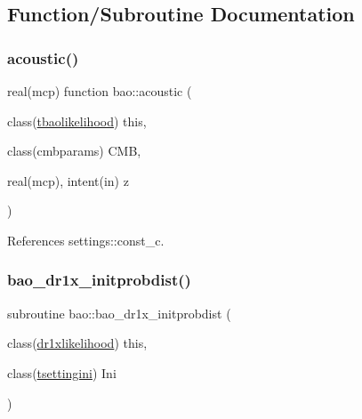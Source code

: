 \subsection{Function/\+Subroutine Documentation}
\mbox{\label{namespacebao_a42575daf8f5c1b68a1a7ddf8bd087988}} 
\subsubsection{\texorpdfstring{acoustic()}{acoustic()}}
{\footnotesize\ttfamily real(mcp) function bao\+::acoustic (\begin{DoxyParamCaption}\item[{class(\mbox{\hyperlink{structbao_1_1tbaolikelihood}{tbaolikelihood}})}]{this,  }\item[{class(cmbparams)}]{C\+MB,  }\item[{real(mcp), intent(in)}]{z }\end{DoxyParamCaption})\hspace{0.3cm}{\ttfamily [private]}}



References settings\+::const\+\_\+c.

\mbox{\label{namespacebao_a01a1351c073ed9d3a96aece01f8c368b}} 
\subsubsection{\texorpdfstring{bao\+\_\+dr1x\+\_\+initprobdist()}{bao\_dr1x\_initprobdist()}}
{\footnotesize\ttfamily subroutine bao\+::bao\+\_\+dr1x\+\_\+initprobdist (\begin{DoxyParamCaption}\item[{class(\mbox{\hyperlink{structbao_1_1dr1xlikelihood}{dr1xlikelihood}})}]{this,  }\item[{class(\mbox{\hyperlink{structsettings_1_1tsettingini}{tsettingini}})}]{Ini }\end{DoxyParamCaption})\hspace{0.3cm}{\ttfamily [private]}}

\mbox{\label{namespacebao_a566724d43b5fe7348c615930295ffefb}} 

